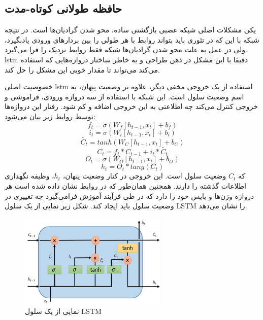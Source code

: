 \subsection{حافظه طولانی کوتاه-مدت}
یکی مشکلات اصلی شبکه عصبی بازگشتی ساده، محو شدن گرادیان‌ها است. در نتیجه شبکه با
این که در تئوری باید بتواند روابط با هر طولی را بین بردارهای ورودی یادبگیرد، ولی
در عمل به علت محو شدن گرادیان‌ها شبکه فقط روابط نزدیک را فرا می‌گیرد. \gls{lstm}
دقیقا با این مشکل در ذهن طراحی و به خاطر ساختار دروازه‌هایی که استفاده می‌کند
می‌تواند تا مقدار خوبی این مشکل را حل کند.

خصوصیت اصلی \gls{lstm} استفاده از یک خروجی مخفی دیگر، علاوه بر وضعیت پنهان، به
اسم وضعیت سلول است. این شبکه با استفاده از سه دروازه ورودی، فراموشی و خروجی
کنترل می‌کند چه اطلاعتی به این خروجی اضافه و کم شود. رفتار این دروازه‌ها توسط
روابط زیر بیان می‌شود:
\begin{equation}
    f_t = \sigma(W_f [h_{t-1},x_t] + b_f)
\end{equation}
\begin{equation}
    i_t = \sigma(W_i [h_{t-1},x_t] + b_i)
\end{equation}
\begin{equation}
    \tilde{C_t} = tanh(W_C [h_{t-1}, x_t] + b_C)
\end{equation}
\begin{equation}
    C_t = f_t * C_{t-1} + i_t * \tilde{C_t}
\end{equation}
\begin{equation}
    O_t = \sigma(W_O [h_{t-1},x_t] + b_O)
\end{equation}
\begin{equation}
    h_t = O_t * tang(C_t)
\end{equation}
که $C_t$ وضعیت سلول است. این خروجی در کنار وضعیت پنهان، $h_t$، وظیفه نگهداری
اطلاعات گذشته را دارند. همچنین همان‌طور که در روابط نشان داده شده است هر دروازه
وزن‌ها و بایس خود را دارد که در طی فرآیند آموزش فرامی‌گیرد چه تغییری در وضعیت
سلول باید ایجاد کند. شکل زیر نمایی از یک سلول \gls{LSTM} را نشان می‌دهد.
\begin{figure}[ht]
    \centering
    \includegraphics[height=4.5cm]{./statics/lstm_cell.png}
    \caption{نمایی از یک سلول \gls{LSTM}}
\end{figure}

